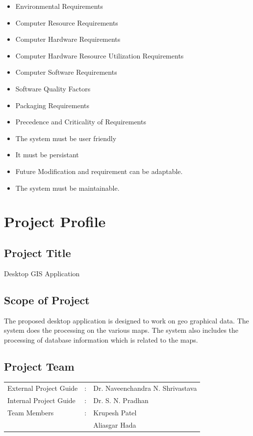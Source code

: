 \begin{itemize}
\begin{itemize}
\item Environmental Requirements
\item Computer Resource Requirements
\item Computer Hardware Requirements
\item Computer Hardware Resource Utilization Requirements
\item Computer Software Requirements
\item Software Quality Factors
\item Packaging Requirements
\item Precedence and Criticality of Requirements
\item The system must be user friendly
\item It must be persistant
\item Future Modification and requirement can be adaptable.
\item The system must be maintainable.
\end{itemize}
\end{itemize}

\section{Project Profile}
\subsection{Project Title}
Desktop GIS Application
\subsection{Scope of Project}
The proposed desktop application is designed to work on geo graphical data. The system does the processing on the various maps. The system also includes the processing of database information which is related to the maps.

\subsection{Project Team}
\begin{tabular}{ l l l }
External Project Guide& :& Dr. Naveenchandra N. Shrivastava\\
Internal Project Guide& :& Dr. S. N. Pradhan\\
Team Members& :& Krupesh Patel\\
 & & Aliasgar Hada
\end{tabular}
